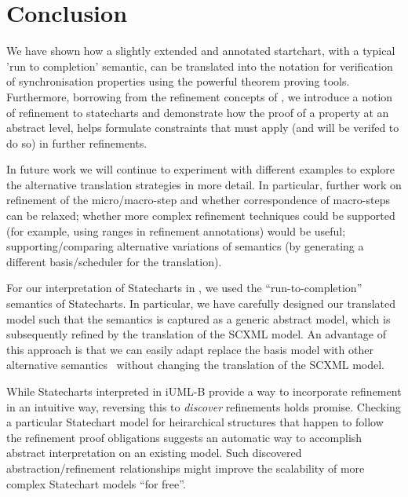 
\section{Conclusion}
\label{sec:conclusion}
We have shown how a slightly extended and annotated startchart, with a typical 'run to completion' semantic, can be translated into the \EventB notation for verification of synchronisation properties using the powerful \EventB theorem proving tools.
Furthermore, borrowing from the refinement concepts of \EventB, we introduce a notion of refinement to statecharts and demonstrate how the proof of a property at an abstract level, helps formulate constraints that must apply (and will be verifed to do so) in further refinements.

In future work we will continue to experiment with different examples to explore the alternative translation strategies in more detail. 
In particular, further work on refinement of the micro/macro-step and whether correspondence of macro-steps can be relaxed; whether more complex refinement techniques could be supported (for example, using ranges in refinement annotations) would be useful; supporting/comparing alternative variations of semantics (by generating a different basis/scheduler for the translation).

For our interpretation of Statecharts in \mbox{\iUMLB}, we used the ``run-to-completion'' semantics of Statecharts.  In particular, we have carefully designed our translated model such that the semantics is captured as a generic abstract model, which is subsequently refined by the translation of the SCXML model.  An advantage of this approach is that we can easily adapt replace the basis model with other alternative semantics~\mbox{\cite{Eshuis_2009}} without changing the translation of the SCXML model. 

While Statecharts interpreted in iUML-B provide a way to incorporate refinement in an intuitive way, reversing this to \emph{discover} refinements holds promise. 
Checking a particular Statechart model for heirarchical structures that happen to follow the refinement proof obligations suggests an automatic way to accomplish abstract interpretation on an existing model.  
Such discovered abstraction/refinement relationships might improve the scalability of more complex Statechart models ``for free''.

